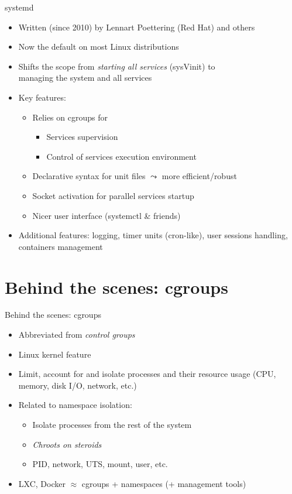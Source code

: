 \documentclass[11pt,final,usepdftitle=false]{beamer}
\begin{document}
\begin{frame}{systemd}
	\begin{itemize}
		\item Written (since 2010) by Lennart Poettering (Red Hat) and others
			\hbr
		\item Now the default on most Linux distributions
			\hbr
		\item Shifts the scope from \textsl{starting all services} (sysVinit) to\\
			\alert{managing the system and all services}
			\hbr
		\item Key features:
			\begin{itemize}
				\item Relies on cgroups for
					\begin{itemize}
						\item Services supervision
						\item Control of services execution environment
					\end{itemize}
					\hbr
				\item Declarative syntax for unit files $\leadsto$ more efficient/robust
					\hbr
				\item Socket activation for parallel services startup
					\hbr
				\item Nicer user interface (systemctl \& friends)
			\end{itemize}
			\hbr
		\item Additional features: logging, timer units (cron-like), user sessions handling, containers management
	\end{itemize}
\end{frame}

\section{Behind the scenes: cgroups}

\begin{frame}{Behind the scenes: cgroups}
\begin{itemize}
\item Abbreviated from \textsl{control groups}
\hbr
\item Linux kernel feature
\hbr
\item Limit, account for and isolate \alert{processes and their resource usage} (CPU, memory, disk I/O, network, etc.)
\hbr
\item Related to \alert{namespace isolation}:
	\begin{itemize}
		\item Isolate processes from the rest of the system
			\hbr
		\item \textsl{Chroots on steroids}
			\hbr
		\item PID, network, UTS, mount, user, etc.
	\end{itemize}
			\hbr
		\item LXC, Docker $\approx$ cgroups + namespaces (+ management tools)
\end{itemize}
\end{frame}
\end{document}

